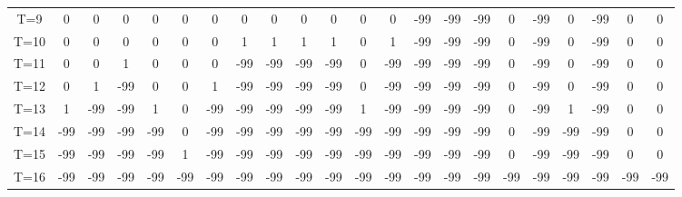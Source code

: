 \documentclass{article}
\begin{document}
\begin{enumerate}
\begin{table}[htbp]
\begin{tabular}{cccccccccccccccccccccc}
		T=9   & 0     & 0     & 0     & 0     & 0     & 0     & 0     & 0     & 0     & 0     & 0     & 0     & -99   & -99   & -99   & 0     & -99   & 0     & -99   & 0     & 0 \\
		T=10  & 0     & 0     & 0     & 0     & 0     & 0     & 1     & 1     & 1     & 1     & 0     & 1     & -99   & -99   & -99   & 0     & -99   & 0     & -99   & 0     & 0 \\
		T=11  & 0     & 0     & 1     & 0     & 0     & 0     & -99   & -99   & -99   & -99   & 0     & -99   & -99   & -99   & -99   & 0     & -99   & 0     & -99   & 0     & 0 \\
		T=12  & 0     & 1     & -99   & 0     & 0     & 1     & -99   & -99   & -99   & -99   & 0     & -99   & -99   & -99   & -99   & 0     & -99   & 0     & -99   & 0     & 0 \\
		T=13  & 1     & -99   & -99   & 1     & 0     & -99   & -99   & -99   & -99   & -99   & 1     & -99   & -99   & -99   & -99   & 0     & -99   & 1     & -99   & 0     & 0 \\
		T=14  & -99   & -99   & -99   & -99   & 0     & -99   & -99   & -99   & -99   & -99   & -99   & -99   & -99   & -99   & -99   & 0     & -99   & -99   & -99   & 0     & 0 \\
		T=15  & -99   & -99   & -99   & -99   & 1     & -99   & -99   & -99   & -99   & -99   & -99   & -99   & -99   & -99   & -99   & 0     & -99   & -99   & -99   & 0     & 0 \\
		T=16  & -99   & -99   & -99   & -99   & -99   & -99   & -99   & -99   & -99   & -99   & -99   & -99   & -99   & -99   & -99   & -99   & -99   & -99   & -99   & -99   & -99 \\
		\bottomrule
	\end{tabular}%
	\label{tab:addlabel}%
\end{table}%


\end{enumerate}
\end{document}
